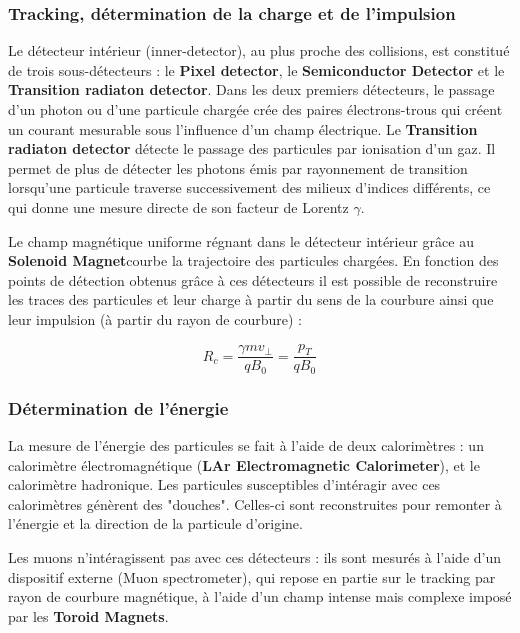 \documentclass[11pt]{article} %
\begin{document}
\subsubsection{Tracking, détermination de la charge et de l'impulsion}

Le détecteur intérieur (inner-detector), au plus proche des collisions, est constitué de trois sous-détecteurs : le \textbf{Pixel detector}, le \textbf{Semiconductor Detector} et le \textbf{Transition radiaton detector}. Dans les deux premiers détecteurs, le passage d'un photon ou d'une particule chargée crée des paires électrons-trous qui créent un courant mesurable sous l'influence d'un champ électrique. 
Le \textbf{Transition radiaton detector} détecte le passage des particules par ionisation d'un gaz. Il permet de plus de détecter les photons émis par rayonnement de transition lorsqu'une particule traverse successivement des milieux d'indices différents, ce qui donne une mesure directe de son facteur de Lorentz $\gamma$.

Le champ magnétique uniforme régnant dans le détecteur  intérieur  grâce au \textbf{Solenoid Magnet}courbe la trajectoire des particules chargées. En fonction des points de détection obtenus grâce à ces détecteurs il est possible de reconstruire les traces des particules et leur charge à partir du sens de la courbure ainsi que leur impulsion (à partir du rayon de courbure) :

\begin{equation} 
R_c = \dfrac{\gamma mv_{\perp}}{qB_0} = \dfrac{p_{T}}{qB_0}
\end{equation}

\subsubsection{Détermination de l'énergie}

La mesure de l'énergie des particules se fait à l'aide de deux calorimètres : un calorimètre électromagnétique (\textbf{LAr Electromagnetic Calorimeter}), et le calorimètre hadronique. Les particules susceptibles d'intéragir avec ces calorimètres génèrent des "douches". Celles-ci sont reconstruites pour remonter à l'énergie et la direction de la particule d'origine.

Les muons n'intéragissent pas avec ces détecteurs : ils sont mesurés à l'aide d'un dispositif externe (Muon spectrometer), qui repose en partie sur le tracking par rayon de courbure magnétique, à l'aide d'un champ intense mais complexe imposé par les \textbf{Toroid Magnets}.
\end{document}
